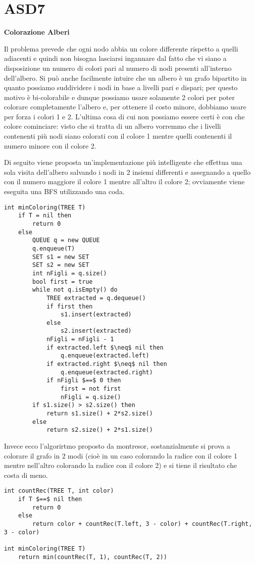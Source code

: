 \documentclass[../cheatSheetAlgoritmi.tex]{subfiles}
\begin{document}
\section{ASD7}
\textbf{Colorazione Alberi}

Il problema prevede che ogni nodo abbia un colore differente rispetto a quelli adiacenti e quindi non bisogna lasciarsi ingannare dal fatto che vi siano a disposizione un numero di colori pari al numero di nodi presenti all'interno dell'albero. Si può anche facilmente intuire che un albero è un grafo bipartito in quanto possiamo suddividere i nodi in base a livelli pari e dispari; per questo motivo è bi-colorabile e dunque possiamo usare solamente 2 colori per poter colorare completamente l'albero e, per ottenere il costo minore, dobbiamo usare per forza i colori 1 e 2. L'ultima cosa di cui non possiamo essere certi è con che colore cominciare: visto che si tratta di un albero vorremmo che i livelli contenenti più nodi siano colorati con il colore 1 mentre quelli contenenti il numero minore con il colore 2.

Di seguito viene proposta un'implementazione più intelligente che effettua una sola visita dell'albero salvando i nodi in 2 insiemi differenti e assegnando a quello con il numero maggiore il colore 1 mentre all'altro il colore 2; ovviamente viene eseguita una BFS utilizzando una coda.
\begin{lstlisting}[caption=Colorazione Alberi]
int minColoring(TREE T)
	if T = nil then
    	return 0
  	else
    	QUEUE q = new QUEUE
    	q.enqueue(T)
    	SET s1 = new SET
    	SET s2 = new SET
    	int nFigli = q.size()
    	bool first = true
    	while not q.isEmpty() do
      		TREE extracted = q.dequeue()
      		if first then
        		s1.insert(extracted)
      		else
        		s2.insert(extracted)
      		nFigli = nFigli - 1
      		if extracted.left $\neq$ nil then
        		q.enqueue(extracted.left)
      		if extracted.right $\neq$ nil then
       			q.enqueue(extracted.right)
      		if nFigli $==$ 0 then
        		first = not first
        		nFigli = q.size()
    	if s1.size() > s2.size() then
      		return s1.size() + 2*s2.size()
    	else
      		return s2.size() + 2*s1.size()
\end{lstlisting}
Invece ecco l'algorirtmo proposto da montresor, sostanzialmente si prova a colorare il grafo in 2 modi (cioè in un caso colorando la radice con il colore 1 mentre nell'altro colorando la radice con il colore 2) e si tiene il risultato che costa di meno.
\begin{lstlisting}[caption=Colorazione Alberi (by Montresor)]
int countRec(TREE T, int color)
	if T $==$ nil then
    	return 0
  	else
    	return color + countRec(T.left, 3 - color) + countRec(T.right, 3 - color)

int minColoring(TREE T)
	return min(countRec(T, 1), countRec(T, 2))
\end{lstlisting}

 
\end{document}
